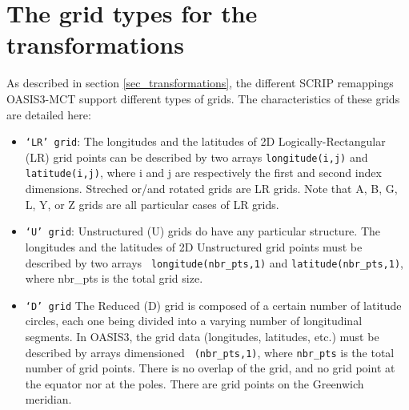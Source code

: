 \newpage
\appendix
\chapter{The grid types for the transformations}
\label{subsec_gridtypes}

As described in section \ref{sec_transformations}, the different
SCRIP remappings OASIS3-MCT support different types of grids. The
characteristics of these grids are detailed here:

\begin{itemize}

\item {\tt `LR' grid}: The longitudes and the latitudes of
  2D Logically-Rectangular (LR) grid points can be described by two arrays
  {\tt longitude(i,j)} and {\tt latitude(i,j)}, where i and j
  are respectively the first and second index dimensions. Streched
  or/and rotated grids are LR grids. Note that A, B, G, L, Y, or Z
  grids are all particular cases of LR grids.

\item {\tt `U' grid}: Unstructured (U) grids do have any particular
      structure. The longitudes and the latitudes of 2D Unstructured
      grid points must be described by two arrays {\tt
      longitude(nbr\_pts,1)} and {\tt latitude(nbr\_pts,1)}, where nbr\_pts
      is the total grid size.

\item {\tt `D' grid} The Reduced (D) grid is composed of a certain
number of latitude circles, each one being divided into a varying
number of longitudinal segments. In OASIS3, the grid data (longitudes,
latitudes, etc.) must be described by arrays dimensioned {\tt
(nbr\_pts,1)}, where {\tt nbr\_pts} is the total number of grid
points. There is no overlap of the grid, and no grid point at the
equator nor at the poles. There are grid points on the Greenwich
meridian.
 
\end{itemize}




